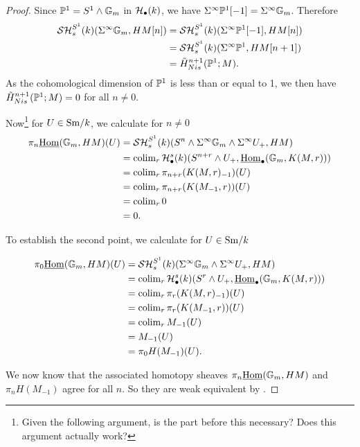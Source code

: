 \documentclass{amsart}%
\begin{document}
\begin{proof}
  Since $\mathbb{P}^1 = S^1 \wedge \mathbb{G}_m$ in $\mathcal{H}_{\bullet}(k)$, we have
  $\Sigma^{\infty} \mathbb{P}^1 [-1] = \Sigma^{\infty} \mathbb{G}_m$. Therefore 
  \begin{align*}
    \mathcal{SH}^{S^1}_s(k)(\Sigma^{\infty}\mathbb{G}_m, HM[n]) & = \mathcal{SH}^{S^1}_s(k)(\Sigma^{\infty}\mathbb{P}^1 [-1], HM[n]) \\
    & = \mathcal{SH}^{S^1}_s(k)(\Sigma^{\infty}\mathbb{P}^1, HM[n+1])\\
    & = \tilde{H}^{n+1}_{Nis}(\mathbb{P}^1;M).
  \end{align*}
  As the cohomological dimension of $\mathbb{P}^1$ is less than or equal to
  1, we then have $\tilde{H}^{n+1}_{Nis}(\mathbb{P}^1;M) = 0$ for all
  $n \neq 0$.

  Now\footnote{Given the following argument, is the part before this
    necessary? Does this argument actually work?} for $U \in \mathrm{Sm}/k$,
  we calculate for $n\neq 0$
  \begin{align*}
\pi_n \underline{\operatorname{Hom}}(\mathbb{G}_m, HM)(U)    
    & = \mathcal{SH}^{S^1}_s(k)(S^n \wedge \Sigma^{\infty}\mathbb{G}_m\wedge \Sigma^{\infty} U_+, HM) \\
    & = \operatorname{colim}_r \mathcal{H}_{\bullet}^s(k)(S^{n+r} \wedge U_+, \underline{\operatorname{Hom}}_{\bullet}(\mathbb{G}_m, K(M,r))) \\
    & = \operatorname{colim}_r \pi_{n+r}(K(M,r)_{-1})(U)\\
    & = \operatorname{colim}_r \pi_{n+r}(K(M_{-1},r))(U)\\
    & = \operatorname{colim}_r 0\\
    & = 0.
  \end{align*}

  To establish the second point, we calculate for $U \in \mathrm{Sm}/k$

  \begin{align*}
\pi_0 \underline{\operatorname{Hom}}(\mathbb{G}_m, HM)(U)    
    & = \mathcal{SH}^{S^1}_s(k)(\Sigma^{\infty}\mathbb{G}_m\wedge \Sigma^{\infty} U_+, HM) \\
    & = \operatorname{colim}_r \mathcal{H}_{\bullet}^s(k)(S^r \wedge U_+, \underline{\operatorname{Hom}}_{\bullet}(\mathbb{G}_m, K(M,r))) \\
    & = \operatorname{colim}_r \pi_r(K(M,r)_{-1})(U)\\
    & = \operatorname{colim}_r \pi_r(K(M_{-1},r))(U)\\
    & = \operatorname{colim}_r M_{-1}(U)\\
    & = M_{-1} (U)\\
    & =\pi_0H(M_{-1})(U).
  \end{align*}

  We now know that the associated homotopy sheaves
  $\pi_n \underline{\operatorname{Hom}}(\mathbb{G}_m, HM)$ and $\pi_nH(M_{-1})$ agree for
  all $n$. So they are weak equivalent by \cite[Lemma 3.2.5]{Mor05}.
\end{proof}
\end{document}
